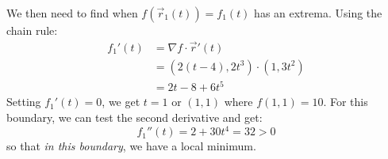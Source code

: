\begin{itemize}
\begin{example}
\begin{equation}
        \end{equation}
        We then need to find when $f(\vec{r}_1(t)) = f_1(t)$ has an extrema. Using the chain rule:
        \begin{align}
            f_1'(t) &= \nabla f \cdot \vec{r}'(t) \\ 
            &= (2(t-4), 2t^3) \cdot (1, 3t^2) \\ 
            &= 2t-8+6t^5
        \end{align}
        Setting $f_1'(t)=0$, we get $t=1$ or $(1,1)$ where $f(1,1) = 10$. For this boundary, we can test the second derivative and get:
        \begin{equation}
            f_1''(t) = 2 + 30t^4 = 32 > 0
        \end{equation}
        so that \textit{in this boundary}, we have a local minimum.
    \end{example}
\end{itemize}